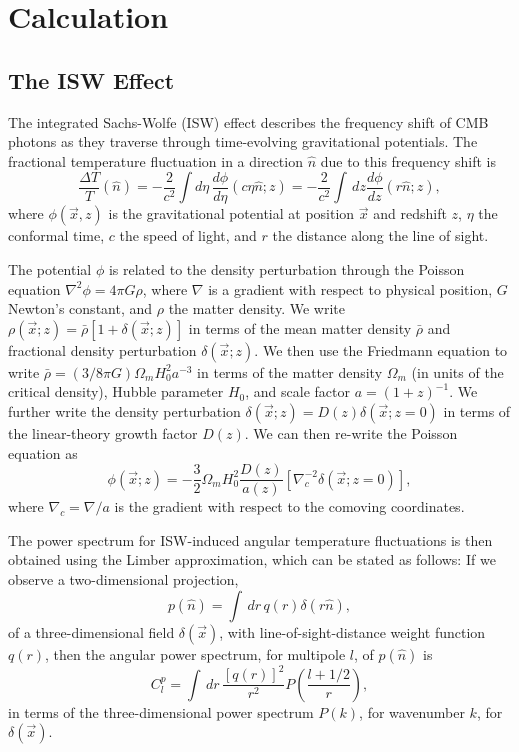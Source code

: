 \documentclass[aps,twocolumn,floats,prd,nofootinbib,10pt,floatfix]{revtex4-1}
\begin{document}
\section{Calculation}
\label{sec:calculation}

\subsection{The ISW Effect}

The integrated Sachs-Wolfe (ISW) effect describes the frequency
shift of CMB photons as they traverse through time-evolving
gravitational potentials.  The fractional temperature
fluctuation in a direction $\hat n$ due to this frequency shift
is 
\begin{equation}
     \frac{\Delta T}{T}(\hat{n}) =
     -\frac{2}{c^2}\int d\eta\,
     \frac{d\phi}{d\eta}(c\eta \hat n;z)
     = -\frac{2}{c^2}\int\, dz 
     \frac{d\phi}{dz}(r \hat n;z),
\label{eqn:isw}
\end{equation}
where $\phi(\vec x,z)$ is the gravitational potential at
position $\vec x$ and redshift $z$, $\eta$ the conformal time,
$c$ the speed of light, and $r$ the distance along the line of
sight.

The potential $\phi$ is related to the density perturbation
through the Poisson equation $\nabla^2 \phi = 4 \pi G \rho$,
where $\nabla$ is a gradient with respect to physical position,
$G$ Newton's constant, and $\rho$ the matter density. We write
$\rho(\vec x;z)= \bar\rho [1+\delta(\vec x;z)]$ in terms of the
mean matter density $\bar \rho$ and fractional density
perturbation $\delta(\vec x;z)$.  We then use the Friedmann
equation to write $\bar \rho = (3/8\pi G) \Omega_m H_0^2 a^{-3}$ in
terms of the matter density $\Omega_m$ (in units of the critical
density), Hubble parameter $H_0$, and scale factor
$a=(1+z)^{-1}$.  We further write the density perturbation
$\delta(\vec x;z) = D(z) \delta(\vec x;z=0)$ in terms of the
linear-theory growth factor $D(z)$.  We can then re-write the
Poisson equation as
\begin{equation}
     \phi(\vec x;z) = -\frac{3}{2} \Omega_m H_0^2
     \frac{D(z)}{a(z)} \left[ \nabla_c^{-2} \delta(\vec x;z=0)
     \right],
\label{eqn:phik}
\end{equation}
where $\nabla_c=\nabla/a$ is the gradient with respect to
the comoving coordinates.

The power spectrum for ISW-induced angular temperature
fluctuations is then obtained using the Limber approximation,
which can be stated as follows:  If we observe a two-dimensional
projection,
\begin{equation}
     p(\hat n) = \int \, dr\, q(r) \delta(r \hat n),
\end{equation}
of a three-dimensional field $\delta(\vec x)$, with
line-of-sight-distance weight function $q(r)$, then the angular
power spectrum, for multipole $l$, of $p(\hat n)$ is
\begin{equation}
    C_l^p = \int \, dr\, \frac{[q(r)]^2}{r^2} P\left(\frac{l+1/2}{r}\right),
\label{eqn:Limber}
\end{equation}
in terms of the three-dimensional power spectrum $P(k)$, for
wavenumber $k$, for $\delta(\vec x)$.
\end{document}
